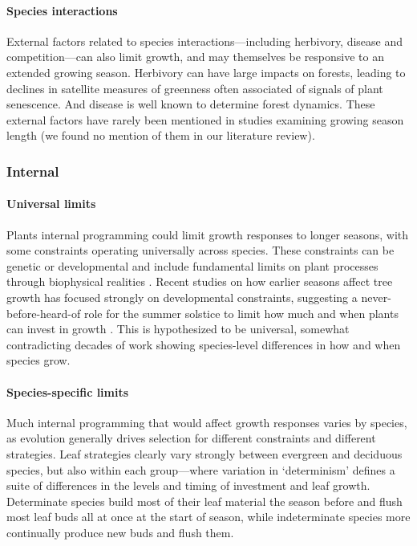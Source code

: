 \documentclass[11pt]{article}
\begin{document}
\paragraph{Species interactions} %

External factors related to species interactions---including herbivory, disease and competition---can also limit growth, and may themselves be responsive to an extended growing season. Herbivory can have large impacts on forests, leading to declines in satellite measures of greenness often associated of signals of plant senescence. And disease is well known to determine forest dynamics. These external factors have rarely been mentioned in studies examining growing season length (we found no mention of them in our literature review). 

\subsubsection*{Internal}

\paragraph{Universal limits} 
Plants internal programming could limit growth responses to longer seasons, with some constraints operating universally across species. These constraints can be genetic or developmental and include fundamental limits on plant processes through biophysical realities \citep[e.g., allometry, chemical reaction limits, and genetic architecture that may limit what trait combinations are possible,][]{ackerly2000evolution}. Recent studies on how earlier seasons affect tree growth has focused strongly on developmental constraints, suggesting a never-before-heard-of role for the summer solstice to limit how much and when plants can invest in growth \citep{zohner2023effect}. This is hypothesized to be universal, somewhat contradicting decades of work showing species-level differences in how and when species grow. %

\paragraph{Species-specific limits}
Much internal programming that would affect growth responses varies by species, as evolution generally drives selection for different constraints and different strategies. Leaf strategies clearly vary strongly between evergreen and deciduous species, but also within each group---where variation in `determinism' defines a suite of differences in the levels and timing of investment and leaf growth. Determinate species build most of their leaf material the season before and flush most leaf buds all at once at the start of season, while indeterminate species more continually produce new buds and flush them. 
\end{document}

